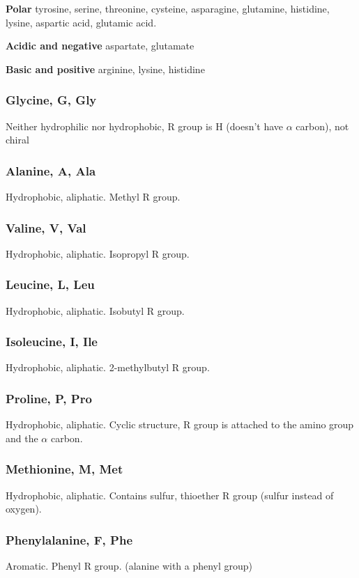 \documentclass[letterpaper, 12pt]{article}
\begin{document}
\textbf{Polar} tyrosine, serine, threonine, cysteine, asparagine, glutamine, histidine, lysine, aspartic acid, glutamic acid.

\textbf{Acidic and negative} aspartate, glutamate

\textbf{Basic and positive} arginine, lysine, histidine

\subsubsection*{Glycine, G, Gly}
Neither hydrophilic nor hydrophobic, R group is H (doesn't have $\alpha$ carbon), not chiral

\subsubsection*{Alanine, A, Ala}
Hydrophobic, aliphatic. Methyl R group.

\subsubsection*{Valine, V, Val}
Hydrophobic, aliphatic. Isopropyl R group.

\subsubsection*{Leucine, L, Leu}
Hydrophobic, aliphatic. Isobutyl R group.

\subsubsection*{Isoleucine, I, Ile}
Hydrophobic, aliphatic. 2-methylbutyl R group.

\subsubsection*{Proline, P, Pro}
Hydrophobic, aliphatic. Cyclic structure, R group is attached to the amino group and the $\alpha$ carbon.

\subsubsection*{Methionine, M, Met}
Hydrophobic, aliphatic. Contains sulfur, thioether R group (sulfur instead of oxygen).

\subsubsection*{Phenylalanine, F, Phe}
Aromatic. Phenyl R group. (alanine with a phenyl group)
\end{document}
